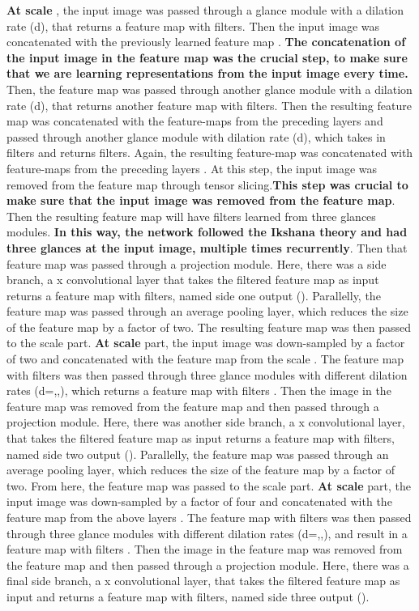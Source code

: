\documentclass{article}
\begin{document}
\textbf{At scale }, the input image was passed through a glance module with a dilation rate (d), that returns a feature map with  filters. Then the input image was concatenated with the previously learned feature map . \textbf{The concatenation of the input image in the feature map was the crucial step, to make sure that we are learning representations from the input image every time.} Then, the feature map was passed through another glance module with a dilation rate (d), that returns another feature map with  filters. Then the resulting feature map was concatenated with the feature-maps from the preceding layers  and passed through another glance module with dilation rate (d), which takes in  filters and returns  filters.  Again, the resulting feature-map was concatenated with feature-maps from the preceding layers . At this step, the input image was removed from the feature map through tensor slicing.\textbf{This step was crucial to make sure that the input image was removed from the feature map}. Then the resulting feature map will have  filters learned from three glances modules. \textbf{In this way, the network followed the Ikshana theory and had three glances at the input image, multiple times recurrently}. Then that feature map was passed through a projection module. Here, there was a side branch, a x convolutional layer that takes the  filtered feature map as input returns a feature map with  filters, named side one output (). Parallelly, the feature map was passed through an average pooling layer, which reduces the size of the feature map by a factor of two. The resulting feature map was then passed to the scale  part. \newline
\textbf{At scale } part, the input image was down-sampled by a factor of two and concatenated with the feature map from the scale  . The feature map with  filters was then passed through three glance modules with different dilation rates (d=,,), which returns a feature map with  filters . Then the image in the feature map was removed from the feature map and then passed through a projection module. Here, there was another side branch, a x convolutional layer, that takes the  filtered feature map as input returns a feature map with  filters, named side two output (). Parallelly, the feature map was passed through an average pooling layer, which reduces the size of the feature map by a factor of two. From here, the feature map was passed to the scale  part.\newline
\textbf{At scale } part, the input image was down-sampled by a factor of four and concatenated with the feature map from the above layers . The feature map with  filters was then passed through three glance modules with different dilation rates (d=,,), and result in a feature map with  filters . Then the image in the feature map was removed from the feature map and then passed through a projection module. Here, there was a final side branch, a x convolutional layer, that takes the  filtered feature map as input and returns a feature map with  filters, named side three output ().\newline
\end{document}
